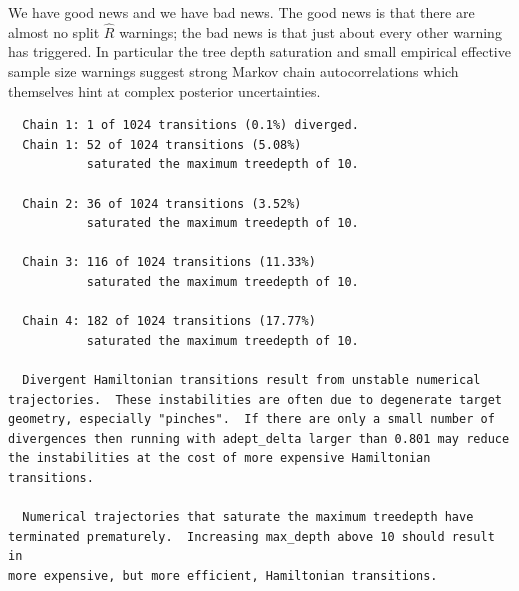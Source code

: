 \documentclass[
  letterpaper,
  DIV=11,
  numbers=noendperiod]{scrartcl}
\newenvironment{Shaded}{\begin{snugshade}}{\end{snugshade}}
\newcommand{\AttributeTok}[1]{\textcolor[rgb]{0.40,0.45,0.13}{#1}}
\newcommand{\DecValTok}[1]{\textcolor[rgb]{0.68,0.00,0.00}{#1}}
\newcommand{\FunctionTok}[1]{\textcolor[rgb]{0.28,0.35,0.67}{#1}}
\newcommand{\NormalTok}[1]{\textcolor[rgb]{0.00,0.23,0.31}{#1}}
\newcommand{\OtherTok}[1]{\textcolor[rgb]{0.00,0.23,0.31}{#1}}
\newcommand{\SpecialCharTok}[1]{\textcolor[rgb]{0.37,0.37,0.37}{#1}}
\newcommand{\StringTok}[1]{\textcolor[rgb]{0.13,0.47,0.30}{#1}}
\begin{document}
\begin{Shaded}
\end{Shaded}

We have good news and we have bad news. The good news is that there are
almost no split \(\hat{R}\) warnings; the bad news is that just about
every other warning has triggered. In particular the tree depth
saturation and small empirical effective sample size warnings suggest
strong Markov chain autocorrelations which themselves hint at complex
posterior uncertainties.

\begin{Shaded}
\end{Shaded}

\begin{verbatim}
  Chain 1: 1 of 1024 transitions (0.1%) diverged.
  Chain 1: 52 of 1024 transitions (5.08%)
           saturated the maximum treedepth of 10.

  Chain 2: 36 of 1024 transitions (3.52%)
           saturated the maximum treedepth of 10.

  Chain 3: 116 of 1024 transitions (11.33%)
           saturated the maximum treedepth of 10.

  Chain 4: 182 of 1024 transitions (17.77%)
           saturated the maximum treedepth of 10.

  Divergent Hamiltonian transitions result from unstable numerical
trajectories.  These instabilities are often due to degenerate target
geometry, especially "pinches".  If there are only a small number of
divergences then running with adept_delta larger than 0.801 may reduce
the instabilities at the cost of more expensive Hamiltonian
transitions.

  Numerical trajectories that saturate the maximum treedepth have
terminated prematurely.  Increasing max_depth above 10 should result in
more expensive, but more efficient, Hamiltonian transitions.
\end{verbatim}
\end{document}
